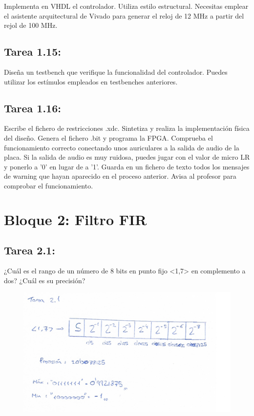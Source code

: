 \documentclass{article}
\begin{document}
Implementa en VHDL el controlador. Utiliza estilo estructural. Necesitas emplear el asistente arquitectural de Vivado para generar el reloj de 12 MHz a partir del rejol de 100 MHz.

\subsection{Tarea 1.15:}

Diseña un testbench que verifique la funcionalidad del controlador. Puedes utilizar los estímulos empleados en testbenches anteriores.

\subsection{Tarea 1.16:}

Escribe el fichero de restricciones .xdc. Sintetiza y realiza la implementación física del diseño. Genera el fichero .bit y programa la FPGA. Comprueba el funcionamiento correcto conectando unos auriculares a la salida de audio de la placa. Si la salida de audio es muy ruidosa, puedes jugar con el valor de micro LR y ponerlo a ’0’ en lugar de a '1'.
Guarda en un fichero de texto todos los mensajes de warning que hayan aparecido en el proceso anterior.
Avisa al profesor para comprobar el funcionamiento.

\section{Bloque 2: Filtro FIR}

\subsection{Tarea 2.1:}
¿Cuál es el rango de un número de 8 bits en punto fijo <1,7> en complemento a dos?
¿Cuál es su precisión?
\begin{figure}[H]
\centering
\includegraphics[width=1\linewidth]{images/2_1.png}
\end{figure}
\end{document}
